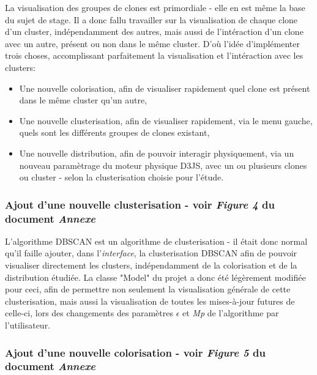 \documentclass[12pt]{report}
\begin{document}
\begin{spacing}{1.2}
La visualisation des groupes de clones est primordiale - elle en est même la base du sujet de stage.
\newline
Il a donc fallu travailler sur la visualisation de chaque clone d'un cluster, indépendamment des autres, mais aussi de l'intéraction d'un clone avec un autre, présent ou non dans le même cluster.
\newline
D'où l'idée d'implémenter trois choses, accomplissant parfaitement la visualisation et l'intéraction avec les clusters:
	\begin{itemize}
	\item{Une nouvelle colorisation, afin de visualiser rapidement quel clone est présent dans le même cluster qu'un autre,}
	\item{Une nouvelle clusterisation, afin de visualiser rapidement, via le menu gauche, quels sont les différents groupes de clones existant,}
	\item{Une nouvelle distribution, afin de pouvoir interagir physiquement, via un nouveau paramètrage du moteur physique D3JS, avec un ou plusieurs clones ou cluster - selon la clusterisation choisie pour l'étude.}
	\end{itemize}

\subsubsection{Ajout d'une nouvelle clusterisation - voir \textit{Figure 4} du document \textit{Annexe}}

L'algorithme DBSCAN est un algorithme de clusterisation - il était donc normal qu'il faille ajouter, dans l'\textit{interface}, la clusterisation DBSCAN afin de pouvoir visualiser directement les clusters, indépendamment de la colorisation et de la distribution étudiée.
\newline
La classe "Model" du projet a donc été légèrement modifiée pour ceci, afin de permettre non seulement la visualisation générale de cette clusterisation, mais aussi la visualisation de toutes les mises-à-jour futures de celle-ci, lors des changements des paramètres $\epsilon$ et \textit{Mp} de l'algorithme par l'utilisateur.

\subsubsection{Ajout d'une nouvelle colorisation - voir \textit{Figure 5} du document \textit{Annexe}}


\end{spacing}
\end{document}

